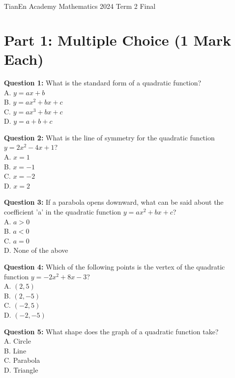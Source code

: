 \documentclass{article}
\begin{document}
\begin{center}
    \huge TianEn Academy Mathematics 2024 Term 2 Final
\end{center}
\section*{Part 1: Multiple Choice (1 Mark Each)}

\textbf{Question 1:} What is the standard form of a quadratic function?\\
A. \( y = ax + b \) \\
B. \( y = ax^2 + bx + c \) \\
C. \( y = ax^3 + bx + c \) \\
D. \( y = a + b + c \) \\

\vspace{10pt}

\textbf{Question 2:} What is the line of symmetry for the quadratic function \( y = 2x^2 - 4x + 1 \)?\\
A. \( x = 1 \) \\
B. \( x = -1 \) \\
C. \( x = -2 \) \\
D. \( x = 2 \) \\

\vspace{10pt}

\textbf{Question 3:} If a parabola opens downward, what can be said about the coefficient 'a' in the quadratic function \( y = ax^2 + bx + c \)?\\
A. \( a > 0 \) \\
B. \( a < 0 \) \\
C. \( a = 0 \) \\
D. None of the above \\

\vspace{10pt}

\textbf{Question 4:} Which of the following points is the vertex of the quadratic function \( y = -2x^2 + 8x - 3 \)?\\
A. \( (2, 5) \) \\
B. \( (2, -5) \) \\
C. \( (-2, 5) \) \\
D. \( (-2, -5) \) \\

\vspace{10pt}

\textbf{Question 5:} What shape does the graph of a quadratic function take?\\
A. Circle \\
B. Line \\
C. Parabola \\
D. Triangle \\
\end{document}
